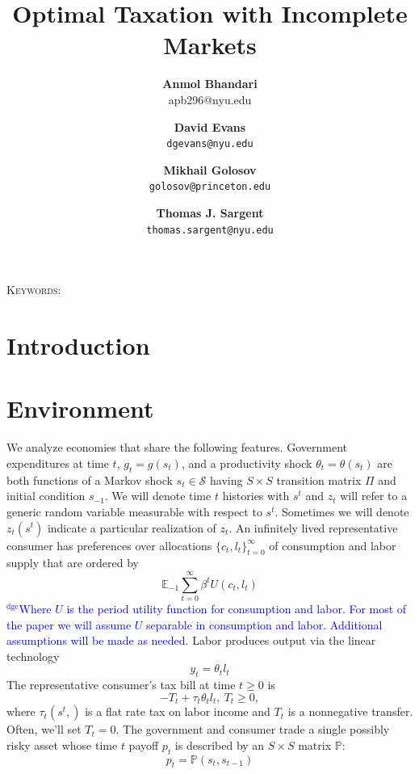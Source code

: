 \documentclass[12pt]{article}
\title {Optimal Taxation with Incomplete Markets}
\author{\textbf{Anmol Bhandari}\\apb296@nyu.edu \and \textbf{David Evans} \\ \texttt{dgevans@nyu.edu} \and \textbf{Mikhail Golosov}\\\texttt{golosov@princeton.edu} \and \textbf{Thomas J. Sargent} \\ \texttt{thomas.sargent@nyu.edu}
}
\newcommand{\dge}[1]{\textcolor{blue}{$^{\textrm{dge}}${#1}}}
\begin{document}
\maketitle



\begin{abstract}

\end{abstract}


\noindent\textsc{Keywords:}
\section{Introduction}


\section{Environment}



We analyze economies that share the following features.
Government expenditures at time $t$, $g_t=g(s_t)$, and a productivity shock $\theta_t=\theta(s_t)$ are both functions of
  a Markov  shock $s_t\in \mathcal{S}$ having  $S \times S$ transition matrix $\Pi$ and initial condition $s_{-1}$. We will denote time $t$ histories with $s^t$ and $z_t$ will refer to a generic random variable measurable with respect to $s^t$. Sometimes we will denote $z_t(s^t)$ indicate a particular realization of $z_t$.
 An infinitely lived representative consumer has preferences over allocations  $\{c_t, l_t\}_{t=0}^\infty$ of consumption and labor supply that are ordered
by
   \begin{equation}
   \label{eqn:obj}
\mathbb{E}_{-1}\sum_{t=0}^{\infty } \beta^t  U\left(
c_t,l_t\right)
\end{equation}%
\dge{Where $U$ is the period utility function for consumption and labor.  For most of the paper we will assume $U$ separable in consumption and labor.  Additional assumptions will be made as needed.}  Labor produces output via the linear technology
  \begin{equation*}
  y_t=\theta_{t} l_{t} \end{equation*}
The representative consumer's tax bill
 at time $t \geq 0$ is
 \[- T_t + \tau_t \theta_{t}l_{t},  \ T_t \geq 0, \]
 where $\tau_t(s^t,)$ is a flat rate tax on labor income and $T_t$ is a nonnegative transfer.
 Often, we'll set $T_t =0$.
The government and consumer trade a single  possibly risky  asset whose  time $t$ payoff $p_t$ is described by an $S \times S$ matrix $\mathbb{P}$:
\[p_t=\mathbb{P}(s_{t},s_{t-1}) \]
\end{document}
